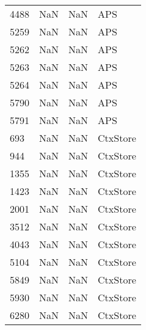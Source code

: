 \begin{tabular}{llll}
4488 &                   NaN &                        NaN &                                       APS \\
5259 &                   NaN &                        NaN &                                       APS \\
5262 &                   NaN &                        NaN &                                       APS \\
5263 &                   NaN &                        NaN &                                       APS \\
5264 &                   NaN &                        NaN &                                       APS \\
5790 &                   NaN &                        NaN &                                       APS \\
5791 &                   NaN &                        NaN &                                       APS \\
693  &                   NaN &                        NaN &                                  CtxStore \\
944  &                   NaN &                        NaN &                                  CtxStore \\
1355 &                   NaN &                        NaN &                                  CtxStore \\
1423 &                   NaN &                        NaN &                                  CtxStore \\
2001 &                   NaN &                        NaN &                                  CtxStore \\
3512 &                   NaN &                        NaN &                                  CtxStore \\
4043 &                   NaN &                        NaN &                                  CtxStore \\
5104 &                   NaN &                        NaN &                                  CtxStore \\
5849 &                   NaN &                        NaN &                                  CtxStore \\
5930 &                   NaN &                        NaN &                                  CtxStore \\
6280 &                   NaN &                        NaN &                                  CtxStore \\

\end{tabular}
